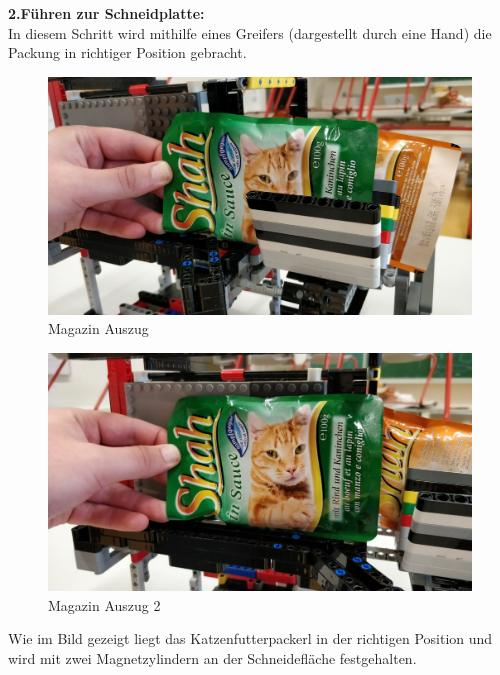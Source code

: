 \documentclass[a4paper,12pt]{scrartcl}
\begin{document}
\newpage 

\textbf{2.Führen zur Schneidplatte:} \\ 

In diesem Schritt wird mithilfe eines Greifers (dargestellt durch eine Hand) die Packung in richtiger Position gebracht.

\begin{figure}[H]
\begin{center}
\includegraphics[width=14cm]{Bilder/Ablauf_1_png/Magazin_Auszug.jpeg}
\caption{Magazin Auszug}
\end{center}
\end{figure}

\begin{figure}[H]
\begin{center}
\includegraphics[width=14cm]{Bilder/Ablauf_1_png/Magazin_Auszug_2.jpeg}
\caption{Magazin Auszug 2}
\end{center}
\end{figure}

Wie im Bild gezeigt liegt das Katzenfutterpackerl in der richtigen Position und wird mit zwei Magnetzylindern an der Schneidefläche festgehalten.
\end{document}
